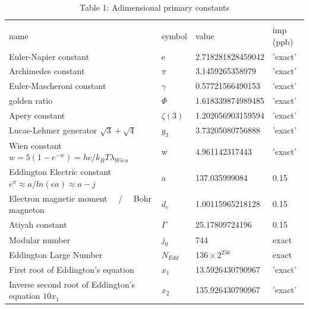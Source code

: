 \documentclass[a4paper,9pt]{article}
\begin{document}
\begin{appendix}
\begin{table}
\caption{Table 1: Adimensional primary constants}
\label{tab:1:table1}
  \hskip-2.5cm\begin{tabular}{llll}
    \toprule
    \multicolumn{4}{c}{}                   \\
    \cmidrule(r){1-4}
    name & symbol    & value & imp (ppb) \\
    \midrule
    
    Euler-Napier constant  & e    & 2.718281828459042 & 'exact' \\
    
    Archimedes constant & $\pi$    & 3.1459265358979 & 'exact' \\ 
    
    Euler-Mascheroni constant & $\gamma$    & 0.57721566490153 & 'exact' \\
    
    golden ratio & $\Phi $    & 1.618339874989485 & 'exact' \\
     
    Apery constant & $\zeta(3)$    & 1.202056903159594 & 'exact' \\
    
    Lucas-Lehmer generator $\sqrt3 + \sqrt4 $  & $g_3$    & 3.73205080756888 & 'exact' \\
    
    Wien constant $w = 5(1-e^{-w})= hc/k_BT\lambda_{Wien}$  & w    & 4.961142317443 & 'exact' \\
    
    Eddington Electric constant ~~~~$e^\pi \approx a/ln(ea)   \approx a-j$  & a    & 137.035999084 & 0.15 \\
    
    Electron magnetic moment ~~/~~ Bohr magneton  & $d_e$    & 1.00115965218128 & 0.15 \\
    
    Atiyah constant & $\Gamma$    & 25.17809724196  & 0.15 \\
    
    Modular number & $j_0$    & 744  & exact \\ 
    
  
     Eddington Large Number & $N_{Edd}$    & $136 \times 2^{256}$  & exact \\
     
      First root of Eddington's equation  & $x_1$    & 13.5926430790967   & 'exact' \\
     
      Inverse second root of Eddington's equation $10x_1$  & $x_2$    & 135.926430790967   & 'exact' \\
     

\end{tabular}
\end{table}
\end{appendix}
\end{document}
